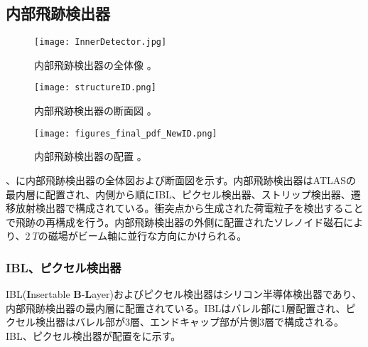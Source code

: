 \subsection{内部飛跡検出器}
\label{sec:InnerDetector}
\begin{figure}[tbp]
  \begin{minipage}[b]{0.45\linewidth}
    \centering
    \texttt{[image: InnerDetector.jpg]}
    \caption[内部飛跡検出器の全体像]{内部飛跡検出器の全体像 \cite{naibuhisekizentai}。}
    \label{fig:InnerDetector}
  \end{minipage}
  \begin{minipage}[b]{0.45\linewidth}
    \centering
    \texttt{[image: structureID.png]}
    \caption[内部飛跡検出器の断面図]{内部飛跡検出器の断面図 \cite{naibuhisekidannmen}。}
    \label{fig:structureID}
  \end{minipage}
\end{figure}

\begin{figure}[tbp]
  \centering
  \texttt{[image: figures\_final\_pdf\_NewID.png]}
  \caption[内部飛跡検出器の配置]{内部飛跡検出器の配置 \cite{studyofID}。 }
  \label{fig:IDfigure}
\end{figure}


、に内部飛跡検出器の全体図および断面図を示す。内部飛跡検出器はATLASの最内層に配置され、内側から順にIBL、ピクセル検出器、ストリップ検出器、遷移放射検出器で構成されている。衝突点から生成された荷電粒子を検出することで飛跡の再構成を行う。内部飛跡検出器の外側に配置されたソレノイド磁石により、$2\ \si{T}$の磁場がビーム軸に並行な方向にかけられる。


\subsubsection{IBL、ピクセル検出器}
\label{sec:pixels}

IBL(\textbf{I}nsertable \textbf{B}-\textbf{L}ayer)およびピクセル検出器はシリコン半導体検出器であり、内部飛跡検出器の最内層に配置されている。IBLはバレル部に1層配置され、ピクセル検出器はバレル部が3層、エンドキャップ部が片側3層で構成される。IBL、ピクセル検出器が配置をに示す。

